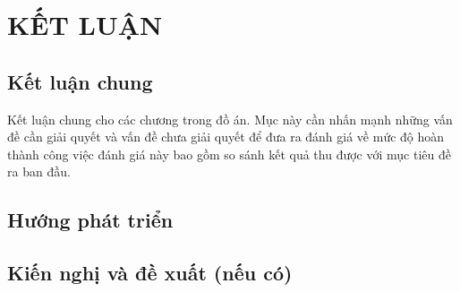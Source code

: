 \section*{\centering KẾT LUẬN}

\subsection*{Kết luận chung}
Kết luận chung cho các chương trong đồ án. Mục này cần nhấn mạnh những vấn đề cần giải quyết và vấn đề chưa giải quyết để đưa ra đánh giá về mức độ hoàn thành công việc đánh giá này bao gồm so sánh kết quả thu được với mục tiêu đề ra ban đầu.

\subsection*{Hướng phát triển}

\subsection*{Kiến nghị và đề xuất (nếu có)}

\cleardoublepage